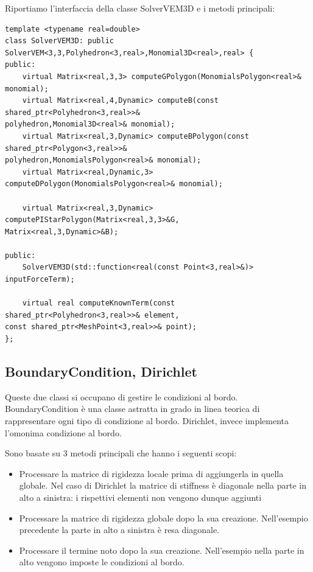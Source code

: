 \documentclass[oneside,12pt]{book}  %
\theoremstyle{plain}
\theoremstyle{definition}
\theoremstyle{remark}
\numberwithin{equation}{chapter} %
\begin{document}
Riportiamo l'interfaccia della classe SolverVEM3D e i metodi principali:

\begin{verbatim}
template <typename real=double>
class SolverVEM3D: public SolverVEM<3,3,Polyhedron<3,real>,Monomial3D<real>,real> {
public:
    virtual Matrix<real,3,3> computeGPolygon(MonomialsPolygon<real>& monomial);
    virtual Matrix<real,4,Dynamic> computeB(const shared_ptr<Polyhedron<3,real>>& 
polyhedron,Monomial3D<real>& monomial);
    virtual Matrix<real,3,Dynamic> computeBPolygon(const shared_ptr<Polygon<3,real>>& 
polyhedron,MonomialsPolygon<real>& monomial);
    virtual Matrix<real,Dynamic,3> computeDPolygon(MonomialsPolygon<real>& monomial);
		
    virtual Matrix<real,3,Dynamic> computePIStarPolygon(Matrix<real,3,3>&G,
Matrix<real,3,Dynamic>&B);
	
public:
    SolverVEM3D(std::function<real(const Point<3,real>&)> inputForceTerm);
 
    virtual real computeKnownTerm(const shared_ptr<Polyhedron<3,real>>& element,
const shared_ptr<MeshPoint<3,real>>& point);	
};

\end{verbatim}

\subsection{BoundaryCondition, Dirichlet}
Queste due classi si occupano di gestire le condizioni al bordo.
BoundaryCondition \`e una classe astratta in grado in linea teorica di
rappresentare ogni tipo di condizione al bordo. Dirichlet, invece
implementa l'omonima condizione al bordo.

Sono basate su 3 metodi principali che hanno i seguenti scopi:
\begin{itemize}
\item
Processare la matrice di rigidezza locale prima di aggiungerla in
quella globale. Nel caso di Dirichlet la matrice di stiffness \`e
diagonale nella parte in alto a sinistra: i rispettivi elementi non vengono
dunque aggiunti

\item 
Processare la matrice di rigidezza globale dopo la sua
creazione. Nell'esempio precedente la parte in alto a sinistra \`e
resa diagonale.

\item
Processare il termine noto dopo la sua creazione. Nell'esempio nella
parte in alto vengono imposte le condizioni al bordo.

\end{itemize}
\end{document}
